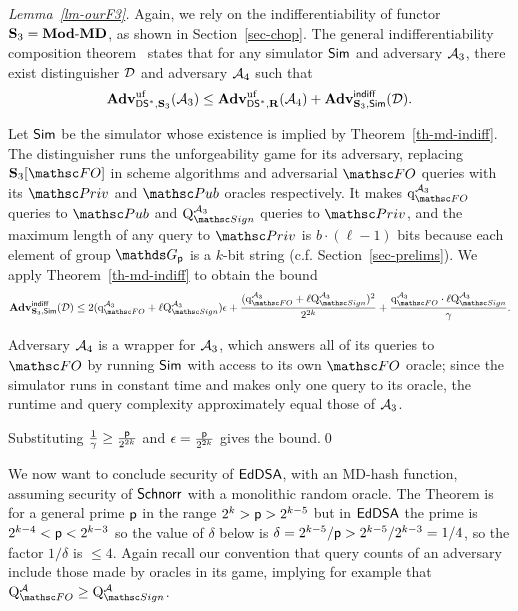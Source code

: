 \begin{proof}[Lemma~\ref{lm-ourF3}]
	Again, we rely on the indifferentiability of functor $\mathbf{S}_3 = \mathbf{Mod\mbox{-}MD}$, as shown in Section~\ref{sec-chop}.
	The general indifferentiability composition theorem~\cite{TCC:MauRenHol04} states that for any simulator $\mathsf{Sim}$ and adversary $\mathcal{A}_3$, there exist distinguisher $\mathcal{D}$ and adversary $\mathcal{A}_4$ such that
	\[\mathbf{Adv}^{\mathrm{uf}}_{\mathsf{DS}^*,\mathbf{S}_3}(\mathcal{A}_3)  \leq \mathbf{Adv}^{\mathrm{uf}}_{\mathsf{DS}^*,\mathbf{R}}(\mathcal{A}_4) + \mathbf{Adv}^{\mathrm{\mathsf{indiff}}}_{\mathbf{S}_3, \mathsf{Sim}}(\mathcal{D}).\]

	Let $\mathsf{Sim}$ be the simulator whose existence is implied by Theorem~\ref{th-md-indiff}.
	The distinguisher runs the unforgeability game for its adversary, replacing $\ourF_3[\HASH]$ in scheme algorithms and adversarial $\HASH$ queries with its $\PrivO$ and $\PubO$ oracles respectively.
	It makes $\QueriesD{\HASH}{\advA_3}$ queries to $\PubO$ and $\Queries{\SignO}{\advA_3}$ queries to $\PrivO$, and the maximum length of any query to $\PrivO$ is $b \cdot (\ell-1)$ bits
	because each element of group $\G_{\Prime}$ is a $k$-bit string (c.f. Section~\ref{sec-prelims}).
 	We apply Theorem~\ref{th-md-indiff} to obtain the bound 
	\[\genAdv{\indiff}{\ourF_3, \simulator}{\advD} \leq 2(
	\QueriesD{\HASH}{\advA_3}+ \ell \Queries{\SignO}{\advA_3}) \epsilon
	+ \frac{(\QueriesD{\HASH}{\advA_3}+ \ell \Queries{\SignO}{\advA_3})^2}{2^{2k}}+\frac{ \QueriesD{\HASH}{\advA_3}\cdot \ell \Queries{\SignO}{\advA_3}}{\gamma}.\]
	
	Adversary $\mathcal{A}_4$ is a wrapper for $\mathcal{A}_3$, which answers all of its queries to $\HASH$ by running $\mathsf{Sim}$ with access to its own $\HASH$ oracle; since the simulator runs in
	constant time and makes only one query to its oracle, the runtime and query complexity approximately equal those of $\mathcal{A}_3$.
	
	Substituting $\frac{1}{\gamma} \geq \frac{\mathsf{p}}{2^{2k}}$ and $\epsilon = \frac{\mathsf{p}}{2^{2k}}$ gives the bound.\qed
\end{proof}
	
 We now want to conclude security of $\mathsf{EdDSA}$, with an MD-hash function, assuming security of $\mathsf{Schnorr}$ with a monolithic random oracle.  The Theorem is for a general prime $\mathsf{p}$ in the range $2^{k} > \mathsf{p} > 2^{k-5}$ but in $\mathsf{EdDSA}$ the prime is $2^{k-4} < \mathsf{p} < 2^{k-3}$ so the value of $\delta$ below is $\delta = 2^{k-5}/\mathsf{p} > 2^{k-5}/2^{k-3} = 1/4$, so the factor $1/\delta$ is $\leq 4$. Again recall our convention that query counts of an adversary include those made by oracles in its game, implying for example that $\Queries{\HASH}{\advA} \geq \Queries{\SignO}{\advA}$.

